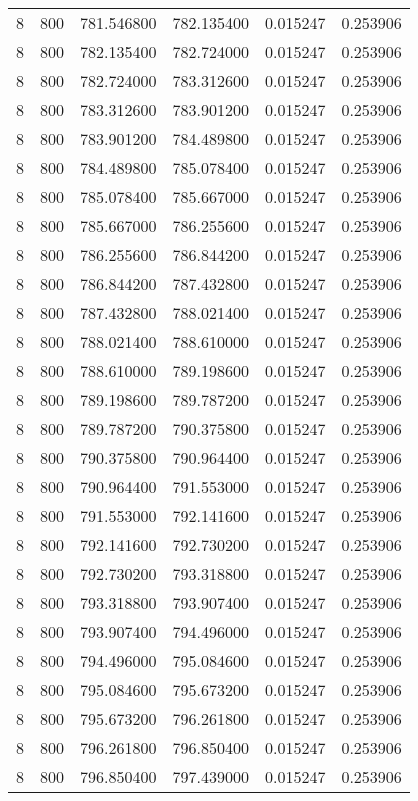 \begin{longtable}{rrrrrr}
8 & 800 & 781.546800 & 782.135400 & 0.015247 & 0.253906 \\
8 & 800 & 782.135400 & 782.724000 & 0.015247 & 0.253906 \\
8 & 800 & 782.724000 & 783.312600 & 0.015247 & 0.253906 \\
8 & 800 & 783.312600 & 783.901200 & 0.015247 & 0.253906 \\
8 & 800 & 783.901200 & 784.489800 & 0.015247 & 0.253906 \\
8 & 800 & 784.489800 & 785.078400 & 0.015247 & 0.253906 \\
8 & 800 & 785.078400 & 785.667000 & 0.015247 & 0.253906 \\
8 & 800 & 785.667000 & 786.255600 & 0.015247 & 0.253906 \\
8 & 800 & 786.255600 & 786.844200 & 0.015247 & 0.253906 \\
8 & 800 & 786.844200 & 787.432800 & 0.015247 & 0.253906 \\
8 & 800 & 787.432800 & 788.021400 & 0.015247 & 0.253906 \\
8 & 800 & 788.021400 & 788.610000 & 0.015247 & 0.253906 \\
8 & 800 & 788.610000 & 789.198600 & 0.015247 & 0.253906 \\
8 & 800 & 789.198600 & 789.787200 & 0.015247 & 0.253906 \\
8 & 800 & 789.787200 & 790.375800 & 0.015247 & 0.253906 \\
8 & 800 & 790.375800 & 790.964400 & 0.015247 & 0.253906 \\
8 & 800 & 790.964400 & 791.553000 & 0.015247 & 0.253906 \\
8 & 800 & 791.553000 & 792.141600 & 0.015247 & 0.253906 \\
8 & 800 & 792.141600 & 792.730200 & 0.015247 & 0.253906 \\
8 & 800 & 792.730200 & 793.318800 & 0.015247 & 0.253906 \\
8 & 800 & 793.318800 & 793.907400 & 0.015247 & 0.253906 \\
8 & 800 & 793.907400 & 794.496000 & 0.015247 & 0.253906 \\
8 & 800 & 794.496000 & 795.084600 & 0.015247 & 0.253906 \\
8 & 800 & 795.084600 & 795.673200 & 0.015247 & 0.253906 \\
8 & 800 & 795.673200 & 796.261800 & 0.015247 & 0.253906 \\
8 & 800 & 796.261800 & 796.850400 & 0.015247 & 0.253906 \\
8 & 800 & 796.850400 & 797.439000 & 0.015247 & 0.253906 \\

\end{longtable}
